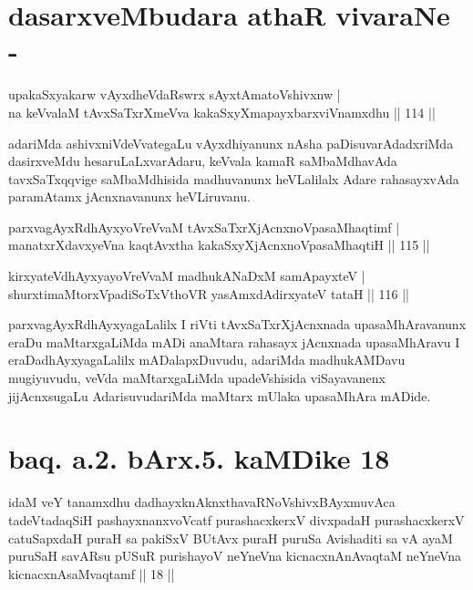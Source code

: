 \section*{dasarxveMbudara athaR vivaraNe -}

\begin{shl}
upakaSxyakarw vAyxdheVdaRswrx sAyxtAmatoV\s shivxnw |\\
na keVvalaM tAvxSaTxrXmeVva kakaSxyXmapayxbarxviVnamxdhu \hfill || 114 ||
\end{shl}

\begin{artha}
adariMda ashivxniVdeVvategaLu vAyxdhiyanunx nAsha paDisuvarAdadxriMda dasirxveMdu hesaruLaLxvarAdaru, keVvala kamaR saMbaMdhavAda tavxSaTxqqvige saMbaMdhisida madhu\-vanunx heVLalilalx Adare rahasayxvAda paramAtamx jAcnxnavanunx heVLiruvanu.
\end{artha}


\begin{shl}
parxvagAyxRdhAyxyoVreVvaM tAvxSaTxrXjAcnxnoVpasaMhaqtimf |\\
manatxrXdavxyeVna kaqtAvx\s tha kakaSxyXjAcnxnoVpasaMhaqtiH \hfill || 115 ||
\end{shl}
\begin{shl}
kirxyateV\s dhAyxyayoVreVvaM madhukANaDxM samApayxteV |\\
shurxtimaMtorxVpadiSoTxV\s thoVR yasAmxdAdirxyateV tataH \hfill || 116 ||
\end{shl}

\begin{artha}
parxvagAyxRdhAyxyagaLalilx I riVti tAvxSaTxrXjAcnxnada upasaMhAravanunx eraDu maMtarx\-gaLiMda mADi anaMtara rahasayx jAcnxnada upasaMhAravu I eraDadhAyxyagaLalilx mADalapxDuvudu, adariMda madhukAMDavu mugiyuvudu, veVda maMtarxgaLiMda upadeVshisida viSayavanenx jijAcnxsugaLu AdarisuvudariMda maMtarx mUlaka upasaMhAra mADide.
\end{artha}

\section*{baq. a.2. bArx.5. kaMDike 18}

\begin{shl}
idaM veY tanamxdhu dadhayxknAknxthavaRNoV\s shivxBAyxmuvAca tadeVtadaqSiH pashayxnanxvoVcatf purashacxkerxV divxpadaH purashacxkerxV catuSapxdaH puraH sa pakiSxV BUtAvx puraH puruSa Avishaditi sa vA ayaM puruSaH savARsu pUSuR purishayoV neYneVna kicnacxnAnAvaqtaM neYneVna kicnacxnAsaMvaqtamf || 18 ||
\end{shl}


